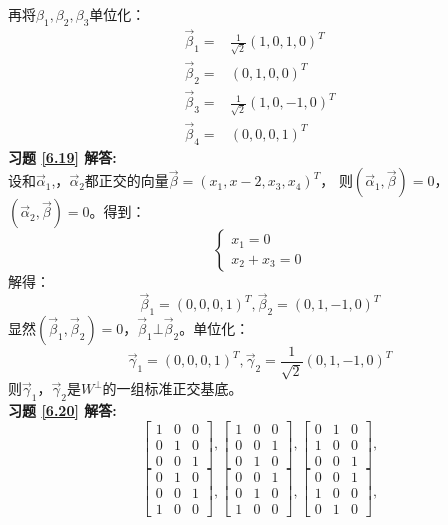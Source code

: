 再将$\beta_1,\beta_2,\beta_3$单位化：
\begin{align*}
\vec{\beta}_1=&\frac{1}{\sqrt{2}}(1,0,1,0)^T\\
\vec{\beta}_2=&(0,1,0,0)^T\\
\vec{\beta}_3=&\frac{1}{\sqrt{2}}(1,0,-1,0)^T\\
\vec{\beta}_4=&(0,0,0,1)^T
\end{align*}
\textbf{习题 \ref{6.19} 解答:}\\
设和$\vec{\alpha}_1$,，$\vec{\alpha}_2$都正交的向量$\vec{\beta}=(x_1,x-2,x_3,x_4)^T$，
则$(\vec{\alpha}_1,\vec{\beta})=0$，$(\vec{\alpha}_2,\vec{\beta})=0$。得到：
\begin{equation*}
  \begin{cases}
  x_1=0\\
  x_2+x_3=0
  \end{cases}
\end{equation*}
解得：
\begin{equation*}
\vec{\beta}_1=(0,0,0,1)^T,\vec{\beta}_2=(0,1,-1,0)^T
\end{equation*}
显然$(\vec{\beta}_1,\vec{\beta}_2)=0$，$\vec{\beta}_1\bot\vec{\beta}_2$。单位化：
\begin{equation*}
\vec{\gamma}_1=(0,0,0,1)^T,\vec{\gamma}_2=\frac{1}{\sqrt{2}}(0,1,-1,0)^T
\end{equation*}
则$\vec{\gamma}_1$，$\vec{\gamma}_2$是$W^{\bot}$的一组标准正交基底。\\
\textbf{习题 \ref{6.20} 解答:}\\
\begin{equation*}
 \begin{bmatrix}1&0&0\\0&1&0\\0&0&1\end{bmatrix},
 \begin{bmatrix}1&0&0\\0&0&1\\0&1&0\end{bmatrix},
 \begin{bmatrix}0&1&0\\1&0&0\\0&0&1\end{bmatrix},
\end{equation*}
\begin{equation*}
 \begin{bmatrix}0&1&0\\0&0&1\\1&0&0\end{bmatrix},
 \begin{bmatrix}0&0&1\\0&1&0\\1&0&0\end{bmatrix},
 \begin{bmatrix}0&0&1\\1&0&0\\0&1&0\end{bmatrix},
\end{equation*}

